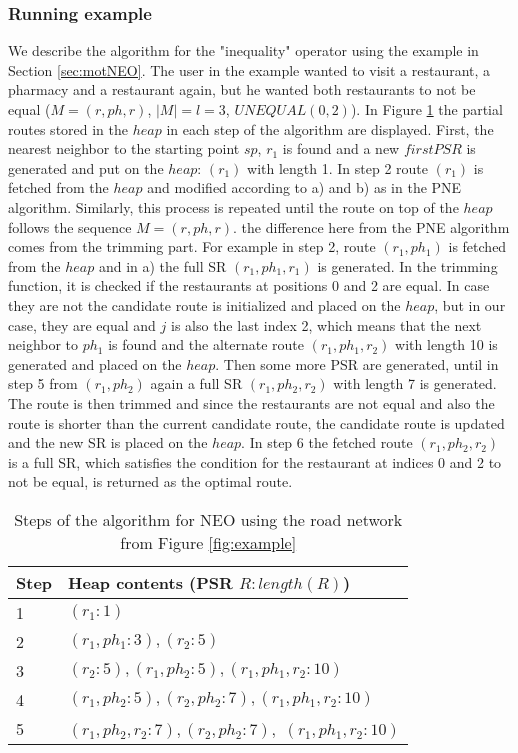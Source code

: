 \subsubsection{Running example}
We describe the algorithm for the "inequality" operator using the example in Section \ref{sec:motNEO}. The user in the example wanted to visit a restaurant, a pharmacy and a restaurant again, but he wanted both restaurants to not be equal ($M = (r, ph, r)$, $|M| = l = 3$, $UNEQUAL(0, 2)$). In Figure \ref{heapNEO} the partial routes stored in the $heap$ in each step of the algorithm are displayed.
First, the nearest neighbor to the starting point $sp$, $r_1$  is found and a new $firstPSR$ is generated and put on the $heap$: $(r_1)$ with length 1. In step 2 route $(r_1)$ is fetched from the $heap$ and modified according to a) and b) as in the PNE algorithm. Similarly, this process is repeated until the route on top of the $heap$ follows the sequence $M = (r, ph, r)$. the difference here from the PNE algorithm comes from the trimming part. For example in step 2, route $(r_1, ph_1)$ is fetched from the $heap$ and in a) the full SR $(r_1, ph_1, r_1)$ is generated. In the trimming function, it is checked if the restaurants at positions 0 and 2 are equal. In case they are not the candidate route is initialized and placed on the $heap$, but in our case, they are equal and $j$ is also the last index 2, which means that the next neighbor to $ph_1$ is found and the alternate route $(r_1, ph_1, r_2)$ with length 10 is generated and placed on the $heap$. Then some more PSR are generated, until in step 5 from $(r_1, ph_2)$ again a full SR $(r_1, ph_2, r_2)$ with length 7 is generated. The route is then trimmed and since the restaurants are not equal and also the route is shorter than the current candidate route, the candidate route is updated and the new SR is placed on the $heap$. In step 6 the fetched route $(r_1, ph_2, r_2)$ is a full SR, which satisfies the condition for the restaurant at indices 0 and 2 to not be equal, is returned as the optimal route.

\begin{table}[h]
	\centering
	\begin{tabular}{ |l|l| } 
		\hline
		Step & Heap contents (PSR $R : length(R)$) \\
		\hline
		1 & $(r_1 : 1)$ \\ 
		 \hline
		2 & $(r_1, ph_1 : 3), (r_2 : 5)$ \\ 
		\hline
		3 & $(r_2 : 5), (r_1, ph_2 : 5), (r_1, ph_1, r_2 : 10)$ \\ 
		\hline
		4 & $(r_1, ph_2 : 5), (r_2, ph_2 : 7), (r_1, ph_1, r_2 : 10)$ \\ 
		\hline
		5 & $(r_1, ph_2, r_2 : 7), (r_2, ph_2 : 7),$ \st{$(r_1, ph_1, r_2 : 10)$} \\ 
		\hline
	\end{tabular}
	\caption{Steps of the algorithm for NEO using the road network from Figure \ref{fig:example}}
	\label{heapNEO}
\end{table}

